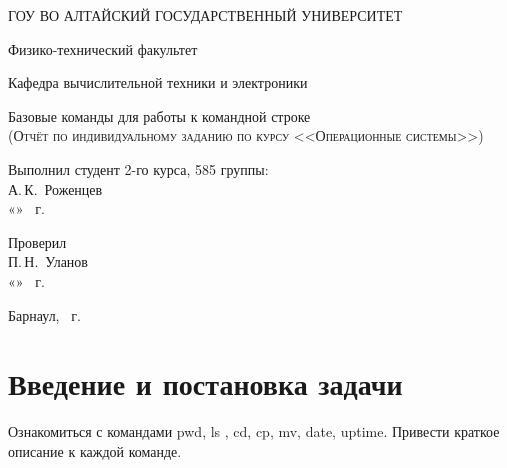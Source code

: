 \documentclass[a4paper,14pt]{extarticle}
\begin{document}
\begin{titlepage}
  \begin{center}
    ГОУ ВО АЛТАЙСКИЙ ГОСУДАРСТВЕННЫЙ УНИВЕРСИТЕТ
    \vspace{0.25cm}
    
    Физико-технический факультет
    
    Кафедра вычислительной техники и электроники
    \vfill
    
    {\LARGE Базовые команды для работы к командной строке}\\[5mm]
    \textsc{(Отчёт по индивидуальному заданию по курсу <<Операционные системы>>)}
  \bigskip

\end{center}
\vfill

\newlength{\ML}
\hfill\begin{minipage}{0.4\textwidth}
  Выполнил студент 2-го курса, 585 группы:\\
  \underline{\hspace{\ML}} А.\,К.~Роженцев\\
  «\underline{\hspace{0.7cm}}» \underline{\hspace{2cm}} \the\year~г.
\end{minipage}%
\bigskip

\hfill\begin{minipage}{0.4\textwidth}
  Проверил\\
  \underline{\hspace{\ML}} П.\,Н.~Уланов\\
  «\underline{\hspace{0.7cm}}» \underline{\hspace{2cm}} \the\year~г.
\end{minipage}%
\vfill

\begin{center}
  Барнаул, \the\year~г.
\end{center}
\end{titlepage}


\tableofcontents

\section{Введение и постановка задачи}
Ознакомиться с командами pwd, ls , cd, cp, mv, date, uptime. Привести краткое описание к каждой команде.
\end{document}
